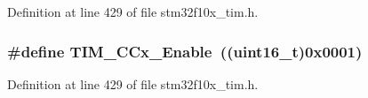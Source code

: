 Definition at line 429 of file stm32f10x\+\_\+tim.\+h.

\subsubsection[{\texorpdfstring{T\+I\+M\+\_\+\+C\+Cx\+\_\+\+Enable}{TIM_CCx_Enable}}]{\setlength{\rightskip}{0pt plus 5cm}\#define T\+I\+M\+\_\+\+C\+Cx\+\_\+\+Enable~(({\bf uint16\+\_\+t})0x0001)}\hypertarget{group___t_i_m___capture___compare__state_ga6acaeb60dad50ce9799ae9f62ed7719a}{}\label{group___t_i_m___capture___compare__state_ga6acaeb60dad50ce9799ae9f62ed7719a}


Definition at line 429 of file stm32f10x\+\_\+tim.\+h.

